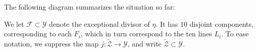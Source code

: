 \documentclass[reqno]{amsart}
\renewcommand{\to}{{\longrightarrow}}
\numberwithin{equation}{section}
\newcommand{\td}{\widetilde}
\begin{document}
The following diagram summarizes the situation so far:
\begin{center}
\end{center}

We let $\mathcal{F} \subset \mathcal{Y}$ denote the exceptional
divisor of $\eta$. It has $10$ disjoint components, corresponding to
each $F_{i}$, which in turn correspond to the ten lines $L_{i}$.
To ease notation, we suppress the map $j \colon \widetilde{\mathcal{Z}} \to \mathcal{Y}$, and write $\widetilde{\mathcal{Z}} \subset \mathcal{Y}$.
\end{document}
